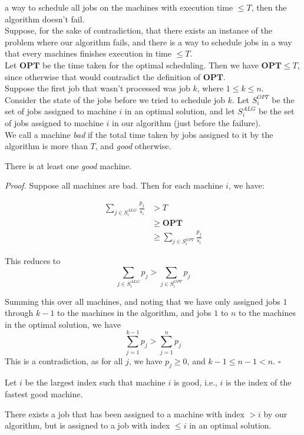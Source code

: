 \documentclass[a4paper]{article}
\newenvironment{proof}{\begin{breakbox}\textit{Proof.}}{\hfill$\square$\end{breakbox}}
\newcommand{\nl}{\vspace{0.2cm}\\}
\newcommand{\OPT}{\mathbf{OPT}}
\begin{document}
a way to schedule all jobs on the machines with execution time $\le T$, then the algorithm doesn't fail.\nl
Suppose, for the sake of contradiction, that there exists an instance of the problem where our algorithm fails, and there is a way to schedule jobs in a way that every machines finishes
execution in time $\le T$.\nl
Let $\OPT$ be the time taken for the optimal scheduling. Then we have $\OPT \le T$, since otherwise that would contradict the definition of $\OPT$.\nl
Suppose the first job that wasn't processed was job $k$, where $1 \le k \le n$.\nl
Consider the state of the jobs before we tried to schedule job $k$. Let $S_i^{OPT}$ be the set of jobs assigned to machine $i$ in an optimal solution, and let $S_i^{ALG}$ be the set of jobs assigned
to machine $i$ in our algorithm (just before the failure).\nl
We call a machine \emph{bad} if the total time taken by jobs assigned to it by the algorithm is more than $T$, and \emph{good} otherwise.\nl
\begin{claim}
    There is at least one \emph{good} machine.
\end{claim}
\begin{proof}
    Suppose all machines are bad. Then for each machine $i$, we have:

    \begin{align*}
        \sum_{j \in S_i^{ALG}} \frac{p_j}{s_i} &> T\\
                                    &\ge \OPT\\
                                    &\ge \sum_{j \in S_i^{OPT}} \frac{p_j}{s_i}
    \end{align*}

    This reduces to
    $$
    \sum_{j \in S_i^{ALG}} p_j > \sum_{j \in S_i^{OPT}} p_j
    $$

    Summing this over all machines, and noting that we have only assigned jobs $1$ through $k - 1$ to the machines in the algorithm, and jobs $1$ to $n$ to the machines in the optimal solution,
    we have
    $$
    \sum_{j = 1}^{k - 1} p_j > \sum_{j = 1}^{n} p_j
    $$
    This is a contradiction, as for all $j$, we have $p_j \ge 0$, and $k - 1 \le n - 1 < n$.
\end{proof}
Let $i$ be the largest index such that machine $i$ is good, i.e., $i$ is the index of the fastest good machine.\nl
\begin{claim}
    There exists a job that has been assigned to a machine with index $> i$ by our algorithm, but is assigned to a job with index $\le i$ in an optimal solution.
\end{claim}
\end{document}
